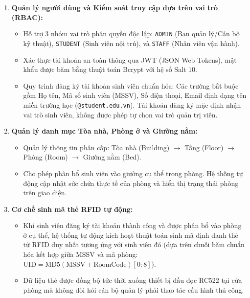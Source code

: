 \begin{enumerate}
    \item \textbf{Quản lý người dùng và Kiểm soát truy cập dựa trên vai trò (RBAC):}
    \begin{itemize}
        \item Hỗ trợ 3 nhóm vai trò phân quyền độc lập: \texttt{ADMIN} (Ban quản lý/Cán bộ kỹ thuật), \texttt{STUDENT} (Sinh viên nội trú), và \texttt{STAFF} (Nhân viên vận hành).
        \item Xác thực tài khoản an toàn thông qua JWT (JSON Web Tokens), mật khẩu được băm bằng thuật toán Bcrypt với hệ số Salt $10$.
        \item Quy trình đăng ký tài khoản sinh viên chuẩn hóa: Các trường bắt buộc gồm Họ tên, Mã số sinh viên (MSSV), Số điện thoại, Email định dạng tên miền trường học (\texttt{@student.edu.vn}). Tài khoản đăng ký mặc định nhận vai trò sinh viên, không được phép tự chọn vai trò quản trị viên.
    \end{itemize}

    \item \textbf{Quản lý danh mục Tòa nhà, Phòng ở và Giường nằm:}
    \begin{itemize}
        \item Quản lý thông tin phân cấp: Tòa nhà (Building) $\rightarrow$ Tầng (Floor) $\rightarrow$ Phòng (Room) $\rightarrow$ Giường nằm (Bed).
        \item Cho phép phân bổ sinh viên vào giường cụ thể trong phòng. Hệ thống tự động cập nhật sức chứa thực tế của phòng và hiển thị trạng thái phòng trên giao diện.
    \end{itemize}

    \item \textbf{Cơ chế sinh mã thẻ RFID tự động:}
    \begin{itemize}
        \item Khi sinh viên đăng ký tài khoản thành công và được phân bổ vào phòng ở cụ thể, hệ thống tự động kích hoạt thuật toán sinh mã định danh thẻ từ RFID duy nhất tương ứng với sinh viên đó (dựa trên chuỗi băm chuẩn hóa kết hợp giữa MSSV và mã phòng: $\text{UID} = \text{MD5}(\text{MSSV} + \text{RoomCode})[0:8]$).
        \item Dữ liệu thẻ được đồng bộ tức thời xuống thiết bị đầu đọc RC522 tại cửa phòng mà không đòi hỏi cán bộ quản lý phải thao tác cấu hình thủ công.
    \end{itemize}


\end{enumerate}
